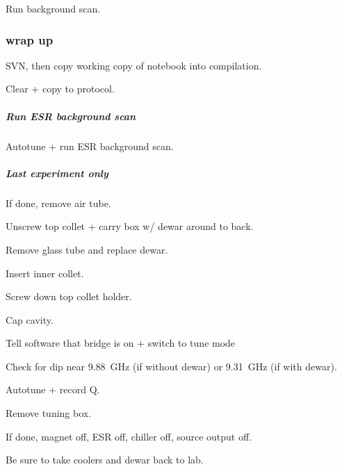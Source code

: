 Run background scan.

\subsubsection{wrap up}
SVN, then copy working copy of notebook into compilation.

Clear + copy to protocol.

\subparagraph{Run ESR background scan}
Autotune + run ESR background scan.

\subparagraph{Last experiment only}
If done, remove air tube.

Unscrew top collet + carry box w/ dewar around to back.

Remove glass tube and replace dewar.

Insert inner collet.

Screw down top collet holder.

Cap cavity.

Tell software that bridge is on + switch to tune mode

Check for dip near 9.88~GHz (if without dewar) or 9.31~GHz (if with dewar).

Autotune + record Q.

Remove tuning box.

If done, magnet off, ESR off, chiller off, source output off.

Be sure to take coolers and dewar back to lab.

\timeblockend
